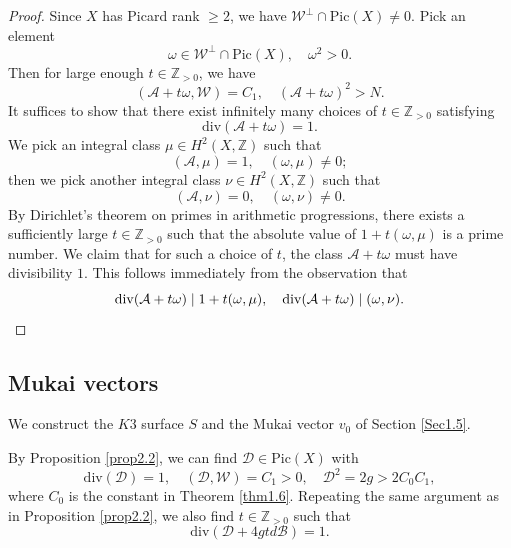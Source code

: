 \documentclass[11pt]{amsart}
\theoremstyle{plain}
\theoremstyle{definition}
\theoremstyle{remark}
\newcommand{\BZ}{{\mathbb{Z}}}
\newcommand{\CA}{{\mathcal A}}
\newcommand{\CB}{{\mathcal B}}
\newcommand{\CD}{{\mathcal D}}
\newcommand{\CW}{{\mathcal W}}
\begin{document}
\begin{proof}
    Since $X$ has Picard rank $\geq 2$, we have $\CW^\perp \cap \mathrm{Pic}(X) \neq 0$. Pick an element 
    \[
    \omega \in \CW^\perp \cap \mathrm{Pic}(X), \quad \omega^2 >0.
    \]
    Then for large enough $t \in \BZ_{>0}$, we have
    \[
    (\CA + t\omega, \CW) = C_1, \quad (\CA + t\omega)^2 >N.
    \]
    It suffices to show that there exist infinitely many choices of $t\in \BZ_{>0}$ satisfying 
    \[
    \mathrm{div}(\CA + t\omega)=1.
    \]
    We pick an integral class $\mu \in H^2(X,\BZ)$ such that
    \[
    (\CA, \mu)=1, \quad (\omega, \mu) \neq 0;
    \]
    then we pick another integral class $\nu \in H^2(X, \BZ)$ such that
    \[(\CA, \nu) = 0, \quad (\omega, \nu) \neq 0.
    \]
    By Dirichlet's theorem on primes in arithmetic progressions, there exists a sufficiently large $t\in \BZ_{>0}$ such that the absolute value of $1 + t(\omega, \mu)$ is a prime number. We claim that for such a choice of $t$, the class $\CA + t\omega$ must have divisibility $1$. This follows immediately from the observation that 
    \[
    \mathrm{div}(\CA + t\omega) \mid 1 + t(\omega, \mu), \quad \mathrm{div}(\CA + t\omega) \mid (\omega, \nu). \qedhere
    \]
\end{proof}


\subsection{Mukai vectors}
We construct the $K3$ surface $S$ and the Mukai vector $v_0$ of Section \ref{Sec1.5}.

By Proposition \ref{prop2.2}, we can find $\CD \in \mathrm{Pic}(X)$ with 
\begin{equation}\label{choice}
\mathrm{div}(\CD)=1, \quad (\CD,\CW) = C_1 > 0, \quad \CD^2 = 2g > 2C_0C_1,
\end{equation}
where $C_0$ is the constant in Theorem \ref{thm1.6}. Repeating the same argument as in Proposition \ref{prop2.2}, we also find $t \in \BZ_{>0}$ such that
\[
\mathrm{div}(\CD+4gtd \CB) =1.
\]

\end{document}
